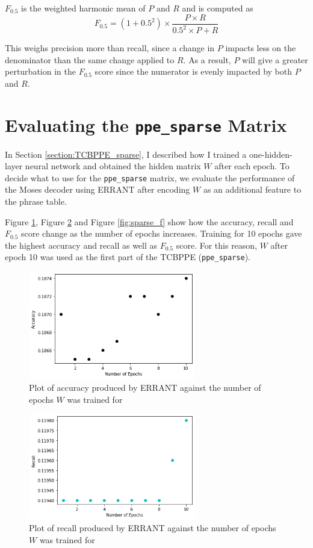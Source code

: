 \documentclass[12pt,a4paper,twoside]{report}
\begin{document}
$F_{0.5}$ is the weighted harmonic mean of $P$ and $R$ and is computed as
\[F_{0.5}=(1+0.5^2)\times\frac{P\times R}{0.5^2\times P+R}\]

This weighs precision more than recall, since a change in $P$ impacts less on the denominator than the same change applied to $R$. As a result, $P$ will give a greater perturbation in the $F_{0.5}$ score since the numerator is evenly impacted by both $P$ and $R$.

\section{Evaluating the \texttt{ppe\_sparse} Matrix}\label{section:sparse_eval}
In Section \ref{section:TCBPPE_sparse}, I described how I trained a one-hidden-layer neural network and obtained the hidden matrix $W$ after each epoch. To decide what to use for the \texttt{ppe\_sparse} matrix, we evaluate the performance of the Moses decoder using ERRANT after encoding $W$ as an additional feature to the phrase table.

Figure \ref{fig:sparse_acc}, Figure \ref{fig:sparse_rec} and Figure \ref{fig:sparse_f} show how the accuracy, recall and $F_{0.5}$ score change as the number of epochs increases. Training for 10 epochs gave the highest accuracy and recall as well as $F_{0.5}$ score. For this reason, $W$ after epoch 10 was used as the first part of the TCBPPE (\texttt{ppe\_sparse}).

\begin{figure}[H]
\centering
\includegraphics[width=0.65\textwidth]{images/sparse_acc.png}
\caption{Plot of accuracy produced by ERRANT against the number of epochs $W$ was trained for}
\label{fig:sparse_acc}
\end{figure}

\begin{figure}[H]
\centering
\includegraphics[width=0.65\textwidth]{images/sparse_rec.png}
\caption{Plot of recall produced by ERRANT against the number of epochs $W$ was trained for}
\label{fig:sparse_rec}
\end{figure}
\end{document}
